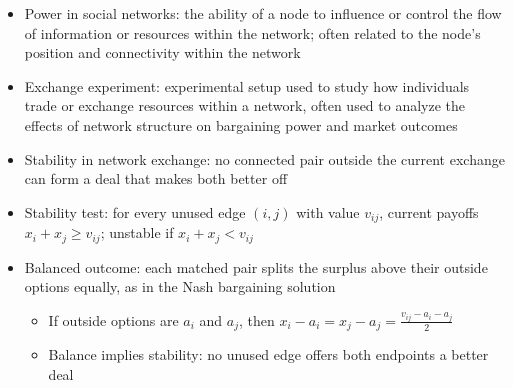 \begin{itemize}
    \item Power in social networks: the ability of a node to influence or control the flow of information or resources within the network; often related to the node's position and connectivity within the network
    \item Exchange experiment: experimental setup used to study how individuals trade or exchange resources within a network, often used to analyze the effects of network structure on bargaining power and market outcomes
    \item Stability in network exchange: no connected pair outside the current exchange can form a deal that makes both better off
    \item Stability test: for every unused edge \((i,j)\) with value \(v_{ij}\), current payoffs \(x_i+x_j \geq v_{ij}\); unstable if \(x_i+x_j < v_{ij}\)
    \item Balanced outcome: each matched pair splits the surplus above their outside options equally, as in the Nash bargaining solution
          \begin{itemize}
              \item If outside options are \(a_i\) and \(a_j\), then \(x_i-a_i=x_j-a_j=\frac{v_{ij}-a_i-a_j}{2}\)
              \item Balance implies stability: no unused edge offers both endpoints a better deal
          \end{itemize}
\end{itemize}